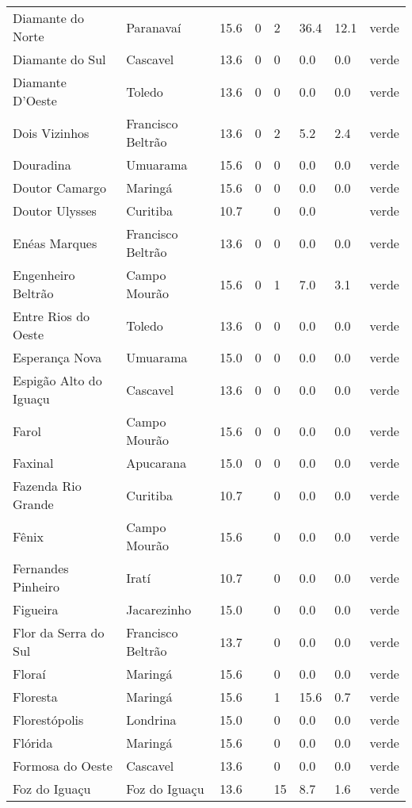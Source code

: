 \begin{longtable}{l|lllllll}
  Diamante do Norte & Paranavaí & 15.6 & 0 & 2 & 36.4 & 12.1 & verde \\ 
  Diamante do Sul & Cascavel & 13.6 & 0 & 0 & 0.0 & 0.0 & verde \\ 
  Diamante D'Oeste & Toledo & 13.6 & 0 & 0 & 0.0 & 0.0 & verde \\ 
  Dois Vizinhos & Francisco Beltrão & 13.6 & 0 & 2 & 5.2 & 2.4 & verde \\ 
  Douradina & Umuarama & 15.6 & 0 & 0 & 0.0 & 0.0 & verde \\ 
  Doutor Camargo & Maringá & 15.6 & 0 & 0 & 0.0 & 0.0 & verde \\ 
  Doutor Ulysses & Curitiba & 10.7 &  & 0 & 0.0 &  & verde \\ 
  Enéas Marques & Francisco Beltrão & 13.6 & 0 & 0 & 0.0 & 0.0 & verde \\ 
  Engenheiro Beltrão & Campo Mourão & 15.6 & 0 & 1 & 7.0 & 3.1 & verde \\ 
  Entre Rios do Oeste & Toledo & 13.6 & 0 & 0 & 0.0 & 0.0 & verde \\ 
  Esperança Nova & Umuarama & 15.0 & 0 & 0 & 0.0 & 0.0 & verde \\ 
  Espigão Alto do Iguaçu & Cascavel & 13.6 & 0 & 0 & 0.0 & 0.0 & verde \\ 
  Farol & Campo Mourão & 15.6 & 0 & 0 & 0.0 & 0.0 & verde \\ 
  Faxinal & Apucarana & 15.0 & 0 & 0 & 0.0 & 0.0 & verde \\ 
  Fazenda Rio Grande & Curitiba & 10.7 &  & 0 & 0.0 & 0.0 & verde \\ 
  Fênix & Campo Mourão & 15.6 &  & 0 & 0.0 & 0.0 & verde \\ 
  Fernandes Pinheiro & Iratí & 10.7 &  & 0 & 0.0 & 0.0 & verde \\ 
  Figueira & Jacarezinho & 15.0 &  & 0 & 0.0 & 0.0 & verde \\ 
  Flor da Serra do Sul & Francisco Beltrão & 13.7 &  & 0 & 0.0 & 0.0 & verde \\ 
  Floraí & Maringá & 15.6 &  & 0 & 0.0 & 0.0 & verde \\ 
  Floresta & Maringá & 15.6 &  & 1 & 15.6 & 0.7 & verde \\ 
  Florestópolis & Londrina & 15.0 &  & 0 & 0.0 & 0.0 & verde \\ 
  Flórida & Maringá & 15.6 &  & 0 & 0.0 & 0.0 & verde \\ 
  Formosa do Oeste & Cascavel & 13.6 &  & 0 & 0.0 & 0.0 & verde \\ 
  Foz do Iguaçu & Foz do Iguaçu & 13.6 &  & 15 & 8.7 & 1.6 & verde \\ 

\end{longtable}
